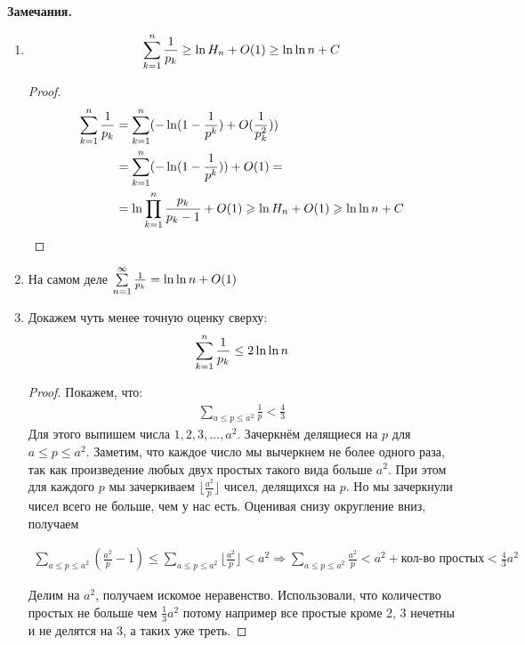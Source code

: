 \textbf{Замечания.} 
\begin{enumerate}
    \item \begin{gather*}
        \sum \limits_{k=1}^n \frac{1}{p_k} \geq \ln H_n + O(1) \geq \ln \ln n + C
    \end{gather*}
    \begin{proof}
        \begin{align*}
            \sum \limits_{k=1}^n \frac{1}{p_k} &= \sum \limits_{k=1}^n (-\ln(1-\frac{1}{p^k}) + O(\frac{1}{p_k^2})) \\ 
            &= \sum \limits_{k=1}^n (-\ln(1-\frac{1}{p^k})) + O(1) = \\
            &= \ln \prod \limits_{k=1}^n \frac{p_k}{p_k-1} + O(1) \geqslant \ln H_n + O(1) \geqslant \ln \ln n + C
        \end{align*}
    \end{proof}
    \item На самом деле $\sum \limits_{n=1}^\infty \frac{1}{p_k} = \ln \ln n + O(1)$
    \item Докажем чуть менее точную оценку сверху:
    \begin{gather*}
        \sum \limits_{k=1}^n \frac{1}{p_k} \leq 2\ln \ln n
    \end{gather*}
    \begin{proof}
        Покажем, что:
        \begin{gather*}
            \sum \limits_{a \leq p \leq a^2} \frac{1}{p} < \frac{4}{3}
        \end{gather*}
        Для этого выпишем числа $1, 2, 3, \ldots, a^2$. Зачеркнём делящиеся на $p$ для $a \leq p \leq a^2$.
        Заметим, что каждое число мы вычеркнем не более одного раза, так как произведение любых двух простых
        такого вида больше $a^2$. При этом для каждого $p$ мы зачеркиваем $\lfloor \frac{a^2}{p} \rfloor$ чисел, делящихся на $p$.
        Но мы зачеркнули чисел всего не больше, чем у нас есть. Оценивая снизу округление вниз, получаем

        \begin{gather*}
            \sum_{a \leq p \leq a^2}(\frac{a^2}{p} - 1) \leqslant \sum_{a \leq p \leq a^2} \lfloor \frac{a^2}{p} \rfloor < a^2
            \Longrightarrow \sum_{a \leq p \leq a^2} \frac{a^2}{p} < a^2 + \text{кол-во простых} < \frac{4}{3}a^2 \
        \end{gather*}

        Делим на $a^2$, получаем искомое неравенство. Использовали, что количество простых не больше чем $\frac{1}{3}a^2$ потому например
        все простые кроме 2, 3 нечетны и не делятся на $3$, а таких уже треть.


\end{proof}
\end{enumerate}

